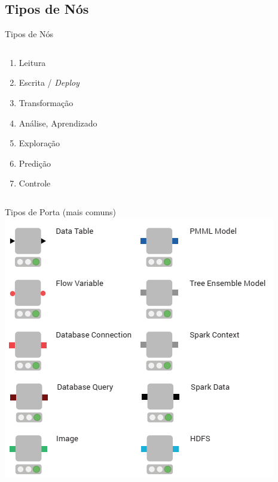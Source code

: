 \documentclass{beamer}
\begin{document}
\subsection{Tipos de Nós}
\begin{frame}{Tipos de Nós}
    \begin{columns}
        \begin{column}{0.5\linewidth}
            \begin{enumerate}
                \item Leitura
                \item Escrita / \textit{Deploy}
                \item Transformação
                \item Análise, Aprendizado
                \item Exploração
                \item Predição
                \item Controle
            \end{enumerate}
        \end{column}
        \begin{column}{0.5\linewidth}
            \centering
            
        \end{column}
    \end{columns}
\end{frame} 

\begin{frame}{Tipos de Porta (mais comuns)}
    \centering
    \includegraphics[width=0.8\textheight]{Images/tiposdeportas.png}    
\end{frame} 
\end{document}
